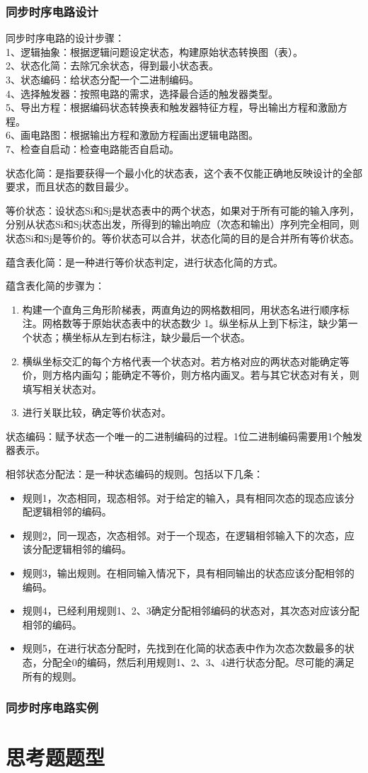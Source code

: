 \documentclass{article}
\begin{document}
	\subsubsection{同步时序电路设计}
	同步时序电路的设计步骤：\\
	1、逻辑抽象：根据逻辑问题设定状态，构建原始状态转换图（表）。\\
	2、状态化简：去除冗余状态，得到最小状态表。\\
	3、状态编码：给状态分配一个二进制编码。\\
	4、选择触发器：按照电路的需求，选择最合适的触发器类型。\\
	5、导出方程：根据编码状态转换表和触发器特征方程，导出输出方程和激励方程。\\
	6、画电路图：根据输出方程和激励方程画出逻辑电路图。\\
	7、检查自启动：检查电路能否自启动。\par
	状态化简：是指要获得一个最小化的状态表，这个表不仅能正确地反映设计的全部要求，而且状态的数目最少。\par
	等价状态：设状态Si和Sj是状态表中的两个状态，如果对于所有可能的输入序列，分别从状态Si和Sj状态出发，所得到的输出响应（次态和输出）序列完全相同，则状态Si和Sj是等价的。等价状态可以合并，状态化简的目的是合并所有等价状态。\par 
	蕴含表化简：是一种进行等价状态判定，进行状态化简的方式。\par
	蕴含表化简的步骤为：
	\begin{enumerate}
		\item 构建一个直角三角形阶梯表，两直角边的网格数相同，用状态名进行顺序标注。网格数等于原始状态表中的状态数少 1。纵坐标从上到下标注，缺少第一个状态；横坐标从左到右标注，缺少最后一个状态。
		\item 横纵坐标交汇的每个方格代表一个状态对。若方格对应的两状态对能确定等价，则方格内画勾；能确定不等价，则方格内画叉。若与其它状态对有关，则填写相关状态对。
		\item 进行关联比较，确定等价状态对。
	\end{enumerate}	
	状态编码：赋予状态一个唯一的二进制编码的过程。1位二进制编码需要用1个触发器表示。
	
	相邻状态分配法：是一种状态编码的规则。包括以下几条：
	\begin{itemize}		
		\item 规则1，次态相同，现态相邻。对于给定的输入，具有相同次态的现态应该分配逻辑相邻的编码。
		\item 规则2，同一现态，次态相邻。对于一个现态，在逻辑相邻输入下的次态，应该分配逻辑相邻的编码。
		\item 规则3，输出规则。在相同输入情况下，具有相同输出的状态应该分配相邻的编码。
		\item 规则4，已经利用规则1、2、3确定分配相邻编码的状态对，其次态对应该分配相邻的编码。
		\item 规则5，在进行状态分配时，先找到在化简的状态表中作为次态次数最多的状态，分配全0的编码，然后利用规则1、2、3、4进行状态分配。尽可能的满足所有的规则。
	\end{itemize}
		
	
	
	\subsubsection{同步时序电路实例}
	\section{思考题题型}
	
\end{document}

